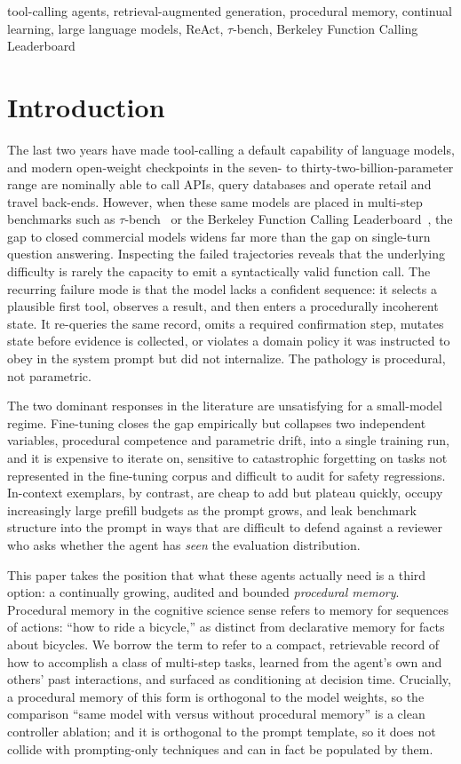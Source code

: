 \documentclass[conference]{IEEEtran}
\begin{document}
\begin{IEEEkeywords}
tool-calling agents, retrieval-augmented generation, procedural
memory, continual learning, large language models, ReAct, $\tau$-bench,
Berkeley Function Calling Leaderboard
\end{IEEEkeywords}

\section{Introduction}

The last two years have made tool-calling a default capability of
language models, and modern open-weight checkpoints in the seven-
to thirty-two-billion-parameter range are nominally able to call
APIs, query databases and operate retail and travel back-ends.
However, when these same models are placed in multi-step
benchmarks such as $\tau$-bench~\cite{taubench} or the Berkeley
Function Calling Leaderboard~\cite{bfcl}, the gap to closed
commercial models widens far more than the gap on single-turn
question answering. Inspecting the failed trajectories reveals
that the underlying difficulty is rarely the capacity to emit a
syntactically valid function call. The recurring failure mode is
that the model lacks a confident sequence: it selects a plausible
first tool, observes a result, and then enters a procedurally
incoherent state. It re-queries the same record, omits a required
confirmation step, mutates state before evidence is collected, or
violates a domain policy it was instructed to obey in the system
prompt but did not internalize. The pathology is procedural, not
parametric.

The two dominant responses in the literature are unsatisfying for
a small-model regime. Fine-tuning closes the gap empirically but
collapses two independent variables, procedural competence and
parametric drift, into a single training run, and it is expensive
to iterate on, sensitive to catastrophic forgetting on tasks not
represented in the fine-tuning corpus and difficult to audit for
safety regressions. In-context exemplars, by contrast, are cheap
to add but plateau quickly, occupy increasingly large prefill
budgets as the prompt grows, and leak benchmark structure into the
prompt in ways that are difficult to defend against a reviewer who
asks whether the agent has \emph{seen} the evaluation distribution.

This paper takes the position that what these agents actually need
is a third option: a continually growing, audited and bounded
\emph{procedural memory}. Procedural memory in the cognitive
science sense refers to memory for sequences of actions: ``how to
ride a bicycle,'' as distinct from declarative memory for facts
about bicycles. We borrow the term to refer to a compact,
retrievable record of how to accomplish a class of multi-step
tasks, learned from the agent's own and others' past interactions,
and surfaced as conditioning at decision time. Crucially, a
procedural memory of this form is orthogonal to the model weights,
so the comparison ``same model with versus without procedural
memory'' is a clean controller ablation; and it is orthogonal to
the prompt template, so it does not collide with prompting-only
techniques and can in fact be populated by them.
\end{document}
